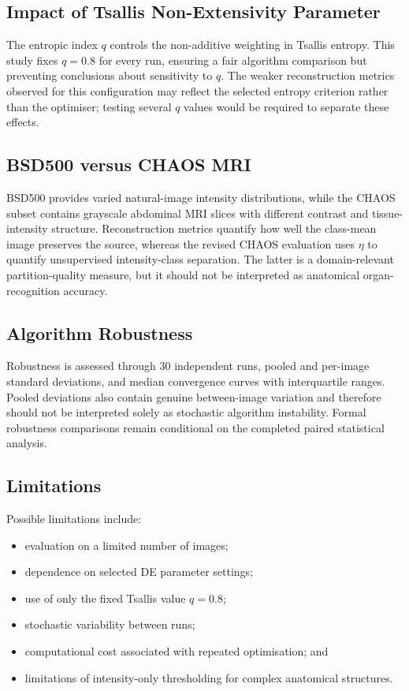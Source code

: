 \documentclass[review]{elsarticle}
\begin{document}
\subsection{Impact of Tsallis Non-Extensivity Parameter}

The entropic index $q$ controls the non-additive weighting in Tsallis
entropy. This study fixes $q=0.8$ for every run, ensuring a fair
algorithm comparison but preventing conclusions about sensitivity to
$q$. The weaker reconstruction metrics observed for this configuration
may reflect the selected entropy criterion rather than the optimiser;
testing several $q$ values would be required to separate these effects.


\subsection{BSD500 versus CHAOS MRI}

BSD500 provides varied natural-image intensity distributions, while the
CHAOS subset contains grayscale abdominal MRI slices with different
contrast and tissue-intensity structure. Reconstruction metrics quantify
how well the class-mean image preserves the source, whereas the revised
CHAOS evaluation uses $\eta$ to quantify unsupervised intensity-class
separation. The latter is a domain-relevant partition-quality measure, but
it should not be interpreted as anatomical organ-recognition accuracy.


\subsection{Algorithm Robustness}

Robustness is assessed through 30 independent runs, pooled and per-image
standard deviations, and median convergence curves with interquartile
ranges. Pooled deviations also contain genuine between-image variation
and therefore should not be interpreted solely as stochastic algorithm
instability. Formal robustness comparisons remain conditional on the
completed paired statistical analysis.


\subsection{Limitations}

Possible limitations include:

\begin{itemize}
    \item evaluation on a limited number of images;
    \item dependence on selected DE parameter settings;
    \item use of only the fixed Tsallis value $q=0.8$;
    \item stochastic variability between runs;
    \item computational cost associated with repeated optimisation; and
    \item limitations of intensity-only thresholding for complex
          anatomical structures.
\end{itemize}
\end{document}
